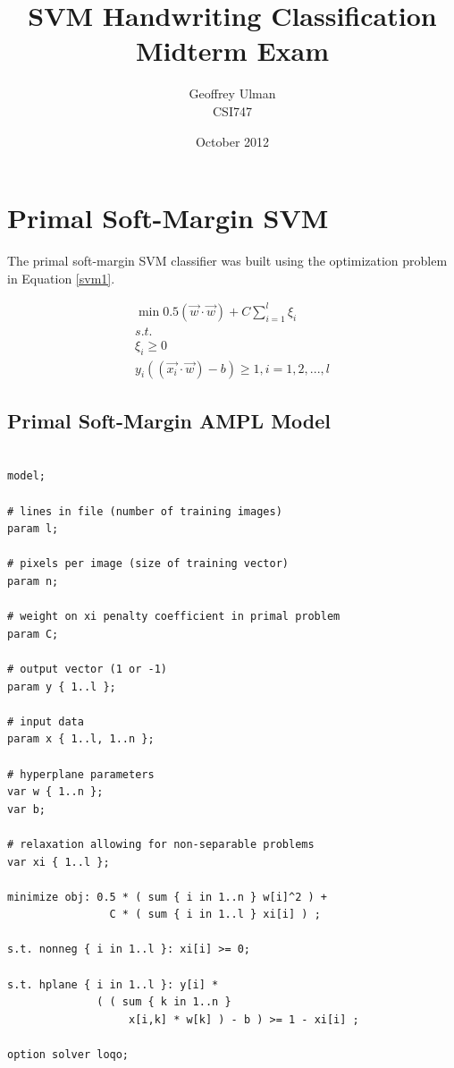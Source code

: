 \documentclass{article}
\begin{document}
\title{SVM Handwriting Classification\\
       Midterm Exam}
\author{Geoffrey Ulman\\
        CSI747}
\date{October 2012}
\maketitle

\section{Primal Soft-Margin SVM}\label{model1}

The primal soft-margin SVM classifier was built using the optimization problem in Equation \ref{svm1}.

\begin{equation}
\begin{split}
\min 0.5\left( \vec{w} \cdot \vec{w} \right) + C \sum_{i=1}^l \xi_i \\
s.t. \\
\xi_i \ge 0 \\
y_i \left( \left( \vec{x_i} \cdot \vec{w} \right) - b \right) \ge 1 , i = 1,2,...,l
\end{split}
\label{svm1}
\end{equation}

\subsection{Primal Soft-Margin AMPL Model}

\begin{verbatim}

model;

# lines in file (number of training images)
param l;

# pixels per image (size of training vector)
param n;

# weight on xi penalty coefficient in primal problem
param C;

# output vector (1 or -1)
param y { 1..l };

# input data
param x { 1..l, 1..n };

# hyperplane parameters
var w { 1..n };
var b;

# relaxation allowing for non-separable problems
var xi { 1..l };

minimize obj: 0.5 * ( sum { i in 1..n } w[i]^2 ) +
                C * ( sum { i in 1..l } xi[i] ) ;

s.t. nonneg { i in 1..l }: xi[i] >= 0;

s.t. hplane { i in 1..l }: y[i] *
              ( ( sum { k in 1..n }
                   x[i,k] * w[k] ) - b ) >= 1 - xi[i] ;

option solver loqo;

\end{verbatim}
\end{document}
